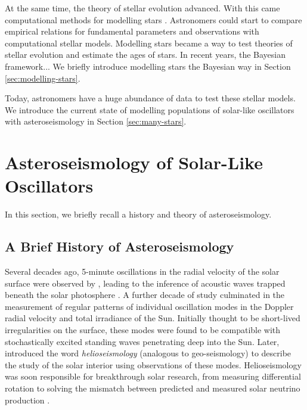 At the same time, the theory of stellar evolution advanced. With this came computational methods for modelling stars \citep{Kippenhahn.Weigert.ea1967}. Astronomers could start to compare empirical relations for fundamental parameters and observations with computational stellar models. Modelling stars became a way to test theories of stellar evolution and estimate the ages of stars. In recent years, the Bayesian framework...  We briefly introduce modelling stars the Bayesian way in Section \ref{sec:modelling-stars}.

Today, astronomers have a huge abundance of data to test these stellar models. We introduce the current state of modelling populations of solar-like oscillators with asteroseismology in Section \ref{sec:many-stars}.


\section[Solar-Like Oscillators]{Asteroseismology of Solar-Like Oscillators}\label{sec:seismo}

In this section, we briefly recall a history and theory of asteroseismology. 

\subsection{A Brief History of Asteroseismology}

Several decades ago, 5-minute oscillations in the radial velocity of the solar surface were observed by \citet{Leighton.Noyes.ea1962}, leading to the inference of acoustic waves trapped beneath the solar photosphere \citep{Ulrich1970}. A further decade of study culminated in the measurement of regular patterns of individual oscillation modes in the Doppler radial velocity \citep{Claverie.Isaak.ea1979} and total irradiance \citep{Woodard.Hudson1983a} of the Sun. Initially thought to be short-lived irregularities on the surface, these modes were found to be compatible with stochastically excited standing waves penetrating deep into the Sun. Later, \citet{Deubner.Gough1984} introduced the word \emph{helioseismology} (analogous to geo-seismology) to describe the study of the solar interior using observations of these modes. Helioseismology was soon responsible for breakthrough solar research, from measuring differential rotation \citep{Deubner.Ulrich.ea1979} to solving the mismatch between predicted and measured solar neutrino production \citep{Bahcall.Ulrich1988}.

